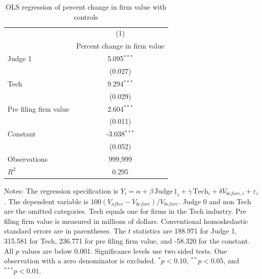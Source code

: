 \begin{table}[!htbp]
\centering
\caption{OLS regression of percent change in firm value with controls}
\label{tab:q6_ols}
\begin{tabular}{lc}
\toprule
 & (1) \\
 & Percent change in firm value \\
\midrule
Judge 1 & 5.095$^{***}$ \\
 & (0.027) \\
\addlinespace[2pt]
Tech & 9.294$^{***}$ \\
 & (0.029) \\
\addlinespace[2pt]
Pre filing firm value & 2.604$^{***}$ \\
 & (0.011) \\
\addlinespace[2pt]
Constant & -3.038$^{***}$ \\
 & (0.052) \\
\midrule
Observations & 999,999 \\
$R^2$ & 0.295 \\
\bottomrule
\end{tabular}
\par\smallskip
\begin{minipage}{0.90\linewidth}
\footnotesize Notes: The regression specification is $Y_i = \alpha + \beta\,\mathrm{Judge\,1}_i + \gamma\,\mathrm{Tech}_i + \delta V_{before,i} + \varepsilon_i$. The dependent variable is $100(V_{after}-V_{before})/V_{before}$. Judge 0 and non Tech are the omitted categories. Tech equals one for firms in the Tech industry. Pre filing firm value is measured in millions of dollars. Conventional homoskedastic standard errors are in parentheses. The $t$ statistics are 188.971 for Judge 1, 315.581 for Tech, 236.771 for pre filing firm value, and -58.320 for the constant. All $p$ values are below 0.001. Significance levels use two sided tests. One observation with a zero denominator is excluded. $^{*}p<0.10$, $^{**}p<0.05$, and $^{***}p<0.01$.
\end{minipage}
\end{table}
